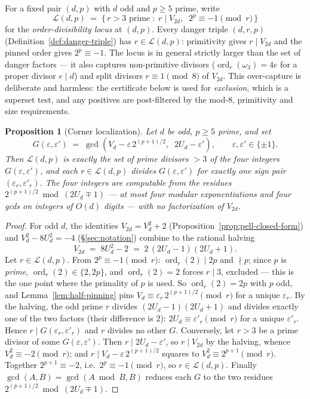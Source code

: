 \documentclass[11pt]{amsart}
\theoremstyle{plain}
\newtheorem{proposition}[theorem]{Proposition}
\theoremstyle{definition}
\theoremstyle{remark}
\numberwithin{equation}{section}
\newcommand{\ord}{\operatorname{ord}}
\begin{document}
For a fixed pair $(d, p)$ with $d$ odd and $p \geq 5$ prime, write
\[
  \mathcal{L}(d, p) \;=\; \{\, r > 3 \text{ prime} \;:\; r \mid V_{2 d},\;\; 2^p \equiv -1 \pmod r \,\}
\]
for the \emph{order-divisibility locus} at $(d, p)$. Every danger triple $(d, r, p)$ (Definition~\ref{def:danger-triple}) has $r \in \mathcal{L}(d, p)$: primitivity gives $r \mid V_{2 d}$ and the pinned order gives $2^p \equiv -1$. The locus is in general strictly larger than the set of danger factors --- it also captures non-primitive divisors ($\ord_r(\omega_3) = 4 e$ for a proper divisor $e \mid d$) and split divisors $r \equiv 1 \pmod 8$ of $V_{2 d}$. This over-capture is deliberate and harmless: the certificate below is used for \emph{exclusion}, which is a superset test, and any positives are post-filtered by the mod-$8$, primitivity and size requirements.

\begin{proposition}[Corner localization]\label{prop:corner-localization}
Let $d$ be odd, $p \geq 5$ prime, and set
\[
  G(\varepsilon, \varepsilon') \;=\; \gcd\!\left(V_d - \varepsilon\, 2^{(p+1)/2},\;\; 2 U_d - \varepsilon'\right), \qquad \varepsilon, \varepsilon' \in \{\pm 1\}.
\]
Then $\mathcal{L}(d, p)$ is exactly the set of prime divisors $> 3$ of the four integers $G(\varepsilon, \varepsilon')$, and each $r \in \mathcal{L}(d, p)$ divides $G(\varepsilon, \varepsilon')$ for exactly one sign pair $(\varepsilon_r, \varepsilon'_r)$. The four integers are computable from the residues $2^{(p+1)/2} \bmod (2 U_d \mp 1)$ --- at most four modular exponentiations and four gcds on integers of $O(d)$ digits --- with no factorization of $V_{2 d}$.
\end{proposition}

\begin{proof}
For odd $d$, the identities $V_{2 d} = V_d^2 + 2$ (Proposition~\ref{prop:pell-closed-form}) and $V_d^2 - 8 U_d^2 = -4$ (\S\ref{sec:notation}) combine to the rational halving
\[
  V_{2 d} \;=\; 8 U_d^2 - 2 \;=\; 2\, (2 U_d - 1)(2 U_d + 1).
\]
Let $r \in \mathcal{L}(d, p)$. From $2^p \equiv -1 \pmod r$: $\ord_r(2) \mid 2 p$ and $\nmid p$; since $p$ is \emph{prime}, $\ord_r(2) \in \{2, 2 p\}$, and $\ord_r(2) = 2$ forces $r \mid 3$, excluded --- this is the one point where the primality of $p$ is used. So $\ord_r(2) = 2 p$ with $p$ odd, and Lemma~\ref{lem:half-pinning} pins $V_d \equiv \varepsilon_r\, 2^{(p+1)/2} \pmod r$ for a unique $\varepsilon_r$. By the halving, the odd prime $r$ divides $(2 U_d - 1)(2 U_d + 1)$ and divides exactly one of the two factors (their difference is $2$): $2 U_d \equiv \varepsilon'_r \pmod r$ for a unique $\varepsilon'_r$. Hence $r \mid G(\varepsilon_r, \varepsilon'_r)$ and $r$ divides no other $G$. Conversely, let $r > 3$ be a prime divisor of some $G(\varepsilon, \varepsilon')$. Then $r \mid 2 U_d - \varepsilon'$, so $r \mid V_{2 d}$ by the halving, whence $V_d^2 \equiv -2 \pmod r$; and $r \mid V_d - \varepsilon\, 2^{(p+1)/2}$ squares to $V_d^2 \equiv 2^{p+1} \pmod r$. Together $2^{p+1} \equiv -2$, i.e.\ $2^p \equiv -1 \pmod r$, so $r \in \mathcal{L}(d, p)$. Finally $\gcd(A, B) = \gcd(A \bmod B, B)$ reduces each $G$ to the two residues $2^{(p+1)/2} \bmod (2 U_d \mp 1)$.
\end{proof}
\end{document}
